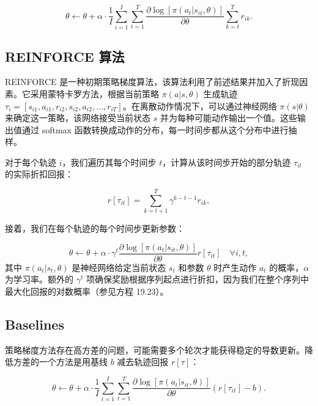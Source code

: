\documentclass[lang=cn,newtx,10pt,scheme=chinese]{elegantbook}
\begin{document}
\begin{equation}
\theta \leftarrow \theta + \alpha \cdot \frac{1}{I} \sum_{i=1}^{I} \sum_{t=1}^{T} \frac{\partial \log [\pi(a_t|s_{it}, \theta)]}{\partial \theta} \sum_{k=t}^{T} r_{ik}. 
\end{equation}

\subsection{REINFORCE 算法}
REINFORCE 是一种初期策略梯度算法，该算法利用了前述结果并加入了折现因素。它采用蒙特卡罗方法，根据当前策略 \(\pi(a|s, \theta)\) 生成轨迹 \(\tau_i = [s_{i1}, a_{i1}, r_{i2}, s_{i2}, a_{i2}, \ldots, r_{iT}]\)。在离散动作情况下，可以通过神经网络 \(\pi(s|\theta)\) 来确定这一策略，该网络接受当前状态 \(s\) 并为每种可能动作输出一个值。这些输出值通过 softmax 函数转换成动作的分布，每一时间步都从这个分布中进行抽样。

对于每个轨迹 \(i\)，我们遍历其每个时间步 \(t\)，计算从该时间步开始的部分轨迹 \(\tau_{it}\) 的实际折扣回报：

\begin{equation}
r[\tau_{it}] = \sum_{k=t+1}^{T} \gamma^{k-t-1} r_{ik}, 
\end{equation}

接着，我们在每个轨迹的每个时间步更新参数：

\begin{equation}
\theta \leftarrow \theta + \alpha \cdot \gamma^{t} \frac{\partial \log [\pi(a_t|s_{it}, \theta)]}{\partial \theta} r[\tau_{it}] \quad \forall i, t, 
\end{equation}
其中 \(\pi(a_t|s_t, \theta)\) 是神经网络给定当前状态 \(s_t\) 和参数 \(\theta\) 时产生动作 \(a_t\) 的概率，\(\alpha\) 为学习率。额外的 \(\gamma^{t}\) 项确保奖励根据序列起点进行折扣，因为我们在整个序列中最大化回报的对数概率（参见方程 19.23）。

\subsection{Baselines}
策略梯度方法存在高方差的问题，可能需要多个轮次才能获得稳定的导数更新。降低方差的一个方法是用基线 \(b\) 减去轨迹回报 \(r[\tau]\)：

\begin{equation}
\theta \leftarrow \theta + \alpha \cdot \frac{1}{I} \sum_{i=1}^{I} \sum_{t=1}^{T} \frac{\partial \log [\pi(a_t|s_{it}, \theta)]}{\partial \theta} (r[\tau_{it}] - b). 
\end{equation}
\end{document}
